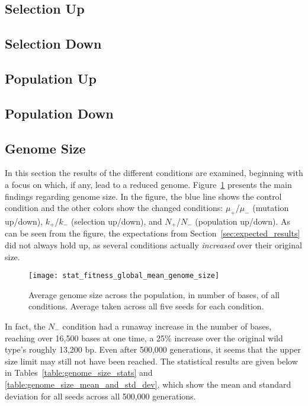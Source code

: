 \subsection{Selection Up}
\subsection{Selection Down}
\subsection{Population Up}
\subsection{Population Down}

\subsection{Genome Size}\label{sec:genome_size}

In this section the results of the different conditions are examined, beginning with a focus on which, if any, lead to a reduced genome. Figure~\ref{fig:genome_size} presents the main findings regarding genome size. In the figure, the blue line shows the control condition and the other colors show the changed conditions: $\mu_+$/$\mu_-$ (mutation up/down), $k_+$/$k_-$ (selection up/down), and $N_+$/$N_-$ (population up/down). As can be seen from the figure, the expectations from Section~\ref{sec:expected_results} did not always hold up, as several conditions actually \textit{increased} over their original size. 
\begin{figure}[H]
	\centering
	\texttt{[image: stat\_fitness\_global\_mean\_genome\_size]}
	\caption[Genome size]{Average genome size across the population, in number of bases, of all conditions. Average taken across all five seeds for each condition.}
	\label{fig:genome_size}
\end{figure}
In fact, the $N_-$ condition had a runaway increase in the number of bases, reaching over 16,500 bases at one time, a 25\% increase over the original wild type's roughly 13,200 bp. Even after 500,000 generations, it seems that the upper size limit may still not have been reached. The statistical results are given below in Tables~\ref{table:genome_size_stats} and \ref{table:genome_size_mean_and_std_dev}, which show the mean and standard deviation for all seeds across all 500,000 generations. 

